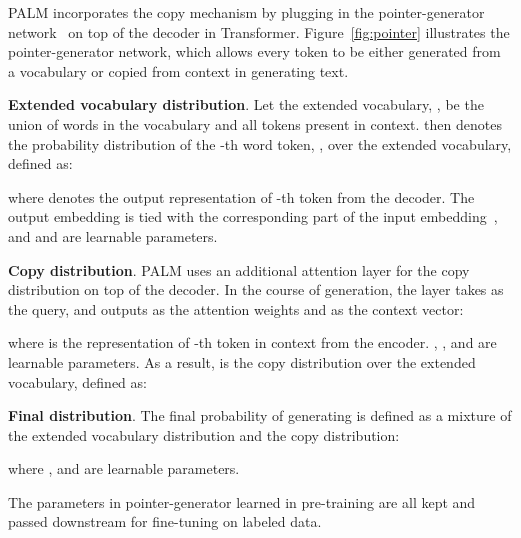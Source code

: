 \documentclass[11pt,a4paper]{article}
\newcommand{\method}{PALM\xspace}
\begin{document}
\method incorporates the copy mechanism by plugging in the pointer-generator network~\cite{See:2017,Nishida:2019} on top of the decoder in Transformer. Figure~\ref{fig:pointer} illustrates the pointer-generator network, which allows every token to be either generated from a vocabulary or copied from context in generating text.

\textbf{Extended vocabulary distribution}. Let the extended vocabulary, , be the union of words in the vocabulary and all tokens present in context.  then denotes the probability distribution of the -th word token, , over the extended vocabulary, defined as:

where  denotes the output representation of -th token from the decoder. The output embedding  is tied with the corresponding part of the input embedding~\cite{Inan:2017}, and  and  are learnable parameters.

\textbf{Copy distribution}. \method uses an additional attention layer for the copy distribution on top of the decoder. In the course of generation, the layer takes  as the query, and outputs  as the attention weights and  as the context vector:

where  is the representation of -th token in context from the encoder. , ,  and  are learnable parameters. As a result,  is the copy distribution over the extended vocabulary, defined as:


\textbf{Final distribution}. The final probability of generating  is defined as a mixture of the extended vocabulary distribution and the copy distribution:

where ,  and  are learnable parameters.

The parameters in pointer-generator learned in pre-training are all kept and passed downstream for fine-tuning on labeled data.
\end{document}
